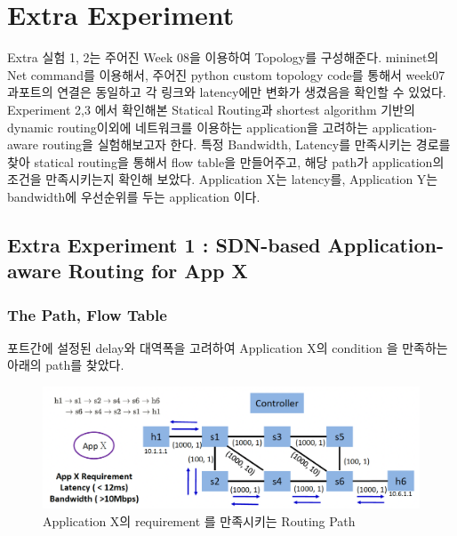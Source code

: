 \section*{Extra Experiment}
Extra 실험 1, 2는 주어진 Week 08을 이용하여 Topology를 구성해준다. mininet의 Net command를 이용해서, 주어진 python custom topology code를 통해서 week07과포트의 연결은 동일하고 각 링크와 latency에만 변화가 생겼음을 확인할 수 있었다.
Experiment 2,3 에서 확인해본 Statical Routing과 shortest algorithm 기반의 dynamic routing이외에 네트워크를 이용하는 application을 고려하는 application-aware routing을 실험해보고자 한다. 특정 Bandwidth, Latency를 만족시키는 경로를 찾아 statical routing을 통해서 flow table을 만들어주고, 해당 path가 application의 조건을 만족시키는지 확인해 보았다.
Application X는 latency를, Application Y는 bandwidth에 우선순위를 두는 application 이다.
    \vspace{-5mm}
    \subsection*{Extra Experiment 1 : SDN-based Application-aware Routing for App X}
        \subsubsection*{The Path, Flow Table}
            포트간에 설정된 delay와 대역폭을 고려하여 Application X의 condition 을 만족하는 아래의 path를 찾았다.\\
                \vspace{-4mm}
            \begin{figure}[!h]\centering 
            	\includegraphics[width=.7\textwidth]{image/week08/e1-0.png}
            	\caption{\footnotesize
            	 Application X의 requirement 를 만족시키는  Routing Path}
            	\vspace{-10pt}
            \end{figure}
            
